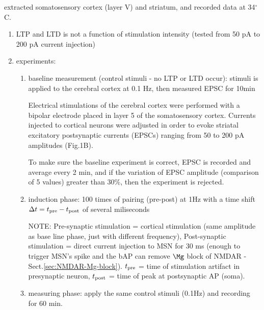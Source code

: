 \citep{fino2010} extracted somatosensory cortex (layer V) and striatum, and
recorded data at 34$^\circ$C.
\begin{enumerate}
  \item LTP and LTD is not a function of stimulation intensity (tested from 50
  pA to 200 pA current injection)
  
  \item experiments:
  \begin{enumerate}
    \item baseline measurement (control stimuli - no LTP or LTD occur): stimuli
    is applied to the cerebral cortex at 0.1 Hz, then measured EPSC for 10min
    
    Electrical stimulations of the cerebral cortex were performed with a bipolar
    electrode placed in layer 5 of the somatosensory cortex. Currents injected
    to cortical neurons were adjusted in order to evoke striatal excitatory
    postsynaptic currents (EPSCs) ranging from 50 to 200 pA amplitudes (Fig.1B).
    
    To make sure the baseline experiment is correct, EPSC is recorded and
    average every 2 min, and if the variation of EPSC amplitude (comparison of 5
    values) greater than 30\%, then the experiment is rejected.
    
    \item induction phase: 100 times of pairing (pre-post) at 1Hz with a time shift
      $\Delta t = t_{{\text{pre}}} - t_{{\text{post}}}$ of several miliseconds
      
      NOTE: Pre-synaptic stimulation = cortical stimulation (same amplitude as
      base line phase, just with different frequency), Post-synaptic stimulation
      = direct current injection to MSN for 30 ms (enough to trigger MSN's spike
      and the bAP can remove $\Mg$ block of NMDAR - Sect.\ref{sec:NMDAR-Mg-block}).
      $t_{{\text{pre}}}$ = time of stimulation artifact in presynaptic neuron, $t_{{\text{post}}}$ =
      time of peak at postsynaptic AP (soma).
      
            
%       
    
    \item measuring phase: apply the same control stimuli (0.1Hz)
    and recording for 60 min.
  \end{enumerate}
  
  
\end{enumerate}

